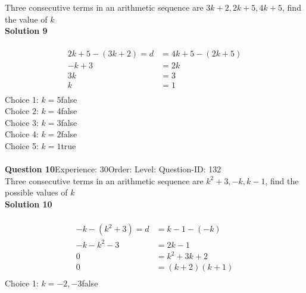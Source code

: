 \documentclass{article}
\begin{document}
Three consecutive terms in an arithmetic sequence are $3k+2,2k+5,4k+5$, find the value of $k$\\[4pt]
\noindent\textbf{Solution 9}\\[2pt]
\\[-35pt]\begin{align*}
2k+5-(3k+2)=d&=4k+5-(2k+5)\\[2pt]
-k+3&=2k\\[2pt]
3k&=3\\[2pt]
k&=1\\[-70pt]
\end{align*}
Choice 1: \hspace{20pt}$k=5$\hspace{20pt}false\\
Choice 2: \hspace{20pt}$k=4$\hspace{20pt}false\\
Choice 3: \hspace{20pt}$k=3$\hspace{20pt}false\\
Choice 4: \hspace{20pt}$k=2$\hspace{20pt}false\\
Choice 5: \hspace{20pt}$k=1$\hspace{20pt}true\\
\\[4pt]
\noindent\textbf{Question 10}\hspace{20pt}Experience: 30\hspace{20pt}Order: \hspace{20pt}Level: \hspace{20pt}Question-ID: 132\\[2pt]
Three consecutive terms in an arithmetic sequence are $k^2+3,-k,k-1$, find the possible values of $k$\\[4pt]
\noindent\textbf{Solution 10}\\[2pt]
\\[-35pt]\begin{align*}
-k-(k^2+3)=d&=k-1-(-k)\\[2pt]
-k-k^2-3&=2k-1\\[2pt]
0&=k^2+3k+2\\[2pt]
0&=(k+2)(k+1)\\[-70pt]
\end{align*}
Choice 1: \hspace{20pt}$k=-2,-3$\hspace{20pt}false\\
\end{document}
